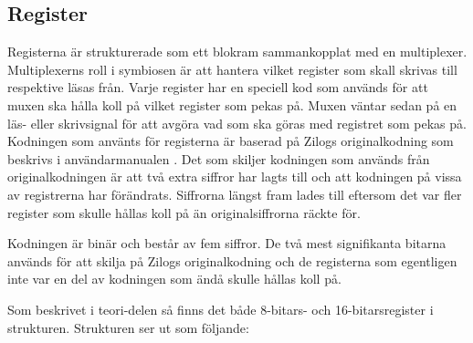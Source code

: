 \documentclass[main.tex]{subfiles}
\begin{document}
\subsection{Register}
Registerna är strukturerade som ett blokram sammankopplat med en multiplexer.
Multiplexerns roll i symbiosen är att hantera vilket register som skall skrivas
till respektive läsas från. Varje register har en speciell kod som används för
att muxen ska hålla koll på vilket register som pekas på. Muxen väntar sedan på
en läs- eller skrivsignal för att avgöra vad som ska göras med registret som
pekas på. Kodningen som använts för registerna är baserad på Zilogs
originalkodning som beskrivs i användarmanualen \cite{userman}. Det som skiljer
kodningen som används från originalkodningen är att två extra siffror har lagts
till och att kodningen på vissa av registrerna har förändrats. Siffrorna längst
fram lades till eftersom det var fler register som skulle hållas koll på än
originalsiffrorna räckte för.

Kodningen är binär och består av fem siffror. De två mest signifikanta bitarna
används för att skilja på Zilogs originalkodning och de registerna som
egentligen inte var en del av kodningen som ändå skulle hållas koll på.

Som beskrivet i teori-delen så finns det både 8-bitars- och 16-bitarsregister i
strukturen. Strukturen ser ut som följande:
\end{document}
